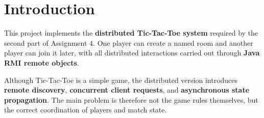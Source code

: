 \clearpage
\section{Introduction}

This project implements the \textbf{distributed Tic-Tac-Toe system} required by
the second part of Assignment 4. One player can create a named room and
another player can join it later, with all distributed interactions carried out
through \textbf{Java RMI remote objects}.

Although Tic-Tac-Toe is a simple game, the distributed version introduces
\textbf{remote discovery}, \textbf{concurrent client requests}, and
\textbf{asynchronous state propagation}. The main problem is therefore not the
game rules themselves, but the correct coordination of players and match
state.
